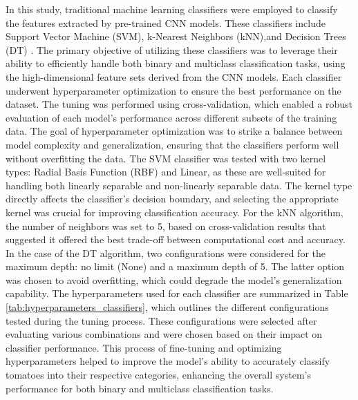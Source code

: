 \documentclass[12pt,a4paper]{report}
\begin{document}
\hspace{1cm}In this study, traditional machine learning classifiers were employed to classify the features extracted by pre-trained CNN models. These classifiers include Support Vector Machine (SVM)\cite{ref18}\cite{ref19}, k-Nearest Neighbors (kNN)\cite{ref20}\cite{ref21},and Decision Trees (DT)\cite{ref22} \cite{ref23}.  The primary objective of utilizing these classifiers was to leverage their ability to efficiently handle both binary and multiclass classification tasks, using the high-dimensional feature sets derived from the CNN models. Each classifier underwent hyperparameter optimization to ensure the best performance on the dataset. The tuning was performed using cross-validation, which enabled a robust evaluation of each model's performance across different subsets of the training data. The goal of hyperparameter optimization was to strike a balance between model complexity and generalization, ensuring that the classifiers perform well without overfitting the data. The SVM classifier was tested with two kernel types: Radial Basis Function (RBF) and Linear, as these are well-suited for handling both linearly separable and non-linearly separable data. The kernel type directly affects the classifier's decision boundary, and selecting the appropriate kernel was crucial for improving classification accuracy. For the kNN algorithm, the number of neighbors was set to 5, based on cross-validation results that suggested it offered the best trade-off between computational cost and accuracy. In the case of the DT algorithm, two configurations were considered for the maximum depth: no limit (None) and a maximum depth of 5. The latter option was chosen to avoid overfitting, which could degrade the model's generalization capability. The hyperparameters used for each classifier are summarized in Table \ref{tab:hyperparameters_classifiers}, which outlines the different configurations tested during the tuning process. These configurations were selected after evaluating various combinations and were chosen based on their impact on classifier performance. This process of fine-tuning and optimizing hyperparameters helped to improve the model's ability to accurately classify tomatoes into their respective categories, enhancing the overall system's performance for both binary and multiclass classification tasks.
\end{document}
